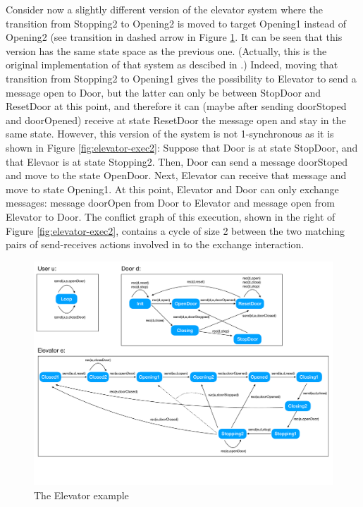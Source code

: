Consider now a slightly different version of the elevator system where the transition from {\sf Stopping2} to {\sf Opening2} is moved to target {\sf Opening1} instead of {\sf Opening2} (see transition in dashed arrow in Figure \ref{fig:elevator}. It can be seen that this version has the same state space as the previous one. (Actually, this is the original implementation of that system as descibed in \cite{XXX}.) Indeed, moving that transition from {\sf Stopping2} to {\sf Opening1} gives the possibility to {\sf Elevator} to send a message open to {\sf Door}, but the latter can only be between {\sf StopDoor} and {\sf ResetDoor} at this point, and therefore it can (maybe after sending {\sf doorStoped} and {\sf doorOpened}) receive at state {\sf ResetDoor} the message {\sf open} and stay in the same state. However, this version of the system is not 1-synchronous as it is shown in Figure \ref{fig:elevator-exec2}: Suppose that {\sf Door} is at state {\sf StopDoor}, and that {\sf Elevaor} is at state {\sf Stopping2}. Then, {\sf Door} can send a message {\sf doorStoped} and move to the state {\sf OpenDoor}. Next, {\sf Elevator} can receive that message and move to state {\sf Opening1}. At this point, {\sf Elevator} and {\sf Door} can only exchange messages: message {\sf doorOpen} from {\sf Door} to {\sf Elevator} and message {\sf open} from {\sf Elevator} to {\sf Door}. The conflict graph of this execution, shown in the right of Figure \ref{fig:elevator-exec2}, contains a cycle of size 2 between the two matching pairs of send-receives actions involved in to the exchange interaction. 

\begin{figure}
\includegraphics[width=13cm]{elevator.pdf}
\caption{The Elevator example}
\label{fig:elevator}
\end{figure}

